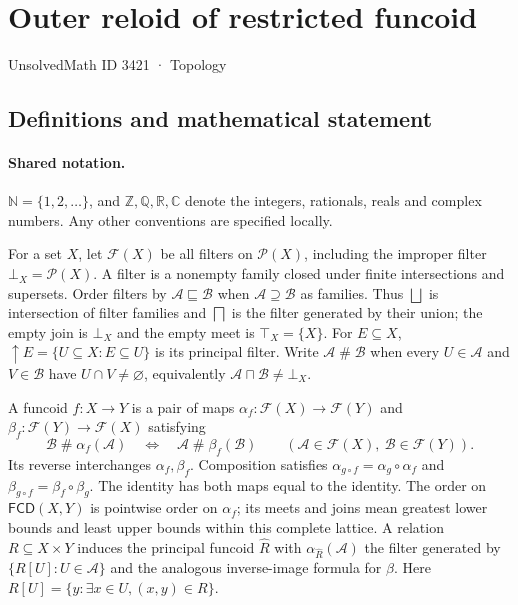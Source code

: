 \documentclass[11pt]{article}
\begin{document}
\setcounter{section}{3420}
\section{Outer reloid of restricted funcoid}\label{3421}
{\small\sffamily UnsolvedMath ID 3421 · Topology}
\subsection{Definitions and mathematical statement}

\paragraph{Shared notation.}$\mathbb N=\{1,2,\ldots\}$, and $\mathbb Z,\mathbb Q,\mathbb R,\mathbb C$ denote the integers, rationals, reals and complex numbers. Any other conventions are specified locally.


For a set $X$, let $\mathcal F(X)$ be all filters on $\mathcal P(X)$, including the improper filter $\bot_X=\mathcal P(X)$. A filter is a nonempty family closed under finite intersections and supersets. Order filters by $\mathcal A\sqsubseteq\mathcal B$ when $\mathcal A\supseteq\mathcal B$ as families. Thus $\bigsqcup$ is intersection of filter families and $\bigsqcap$ is the filter generated by their union; the empty join is $\bot_X$ and the empty meet is $\top_X=\{X\}$. For $E\subseteq X$, $\uparrow E=\{U\subseteq X:E\subseteq U\}$ is its principal filter. Write $\mathcal A\mathrel{\#}\mathcal B$ when every $U\in\mathcal A$ and $V\in\mathcal B$ have $U\cap V\ne\varnothing$, equivalently $\mathcal A\sqcap\mathcal B\ne\bot_X$.

A funcoid $f:X\to Y$ is a pair of maps $\alpha_f:\mathcal F(X)\to\mathcal F(Y)$ and $\beta_f:\mathcal F(Y)\to\mathcal F(X)$ satisfying
\[
 \mathcal B\mathrel{\#}\alpha_f(\mathcal A)
 \quad\Longleftrightarrow\quad
 \mathcal A\mathrel{\#}\beta_f(\mathcal B)
 \qquad(\mathcal A\in\mathcal F(X),\ \mathcal B\in\mathcal F(Y)).
\]
Its reverse interchanges $\alpha_f,\beta_f$. Composition satisfies $\alpha_{g\circ f}=\alpha_g\circ\alpha_f$ and $\beta_{g\circ f}=\beta_f\circ\beta_g$. The identity has both maps equal to the identity. The order on $\mathsf{FCD}(X,Y)$ is pointwise order on $\alpha_f$; its meets and joins mean greatest lower bounds and least upper bounds within this complete lattice. A relation $R\subseteq X\times Y$ induces the principal funcoid $\widehat R$ with $\alpha_{\widehat R}(\mathcal A)$ the filter generated by $\{R[U]:U\in\mathcal A\}$ and the analogous inverse-image formula for $\beta$. Here $R[U]=\{y:\exists x\in U,(x,y)\in R\}$.
\end{document}
